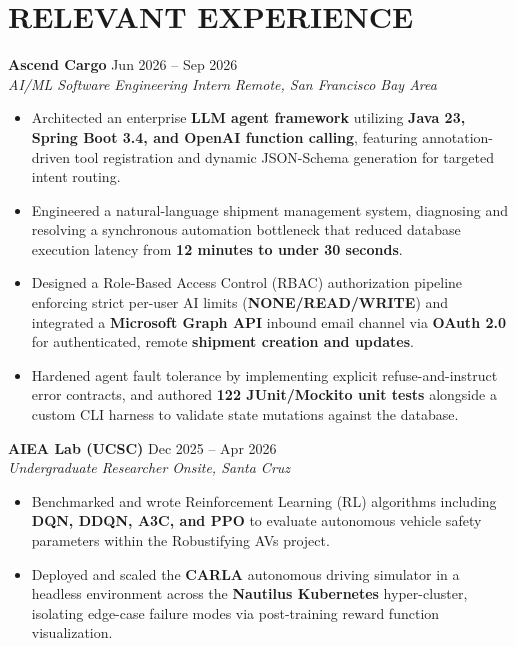 \documentclass[a4paper,10pt]{extarticle}
\begin{document}
\section*{RELEVANT EXPERIENCE}

    \noindent
    \textbf{Ascend Cargo} \hfill Jun 2026 -- Sep 2026 \\
    \textit{AI/ML Software Engineering Intern} \hfill \textit{Remote, San Francisco Bay Area}
    \begin{itemize}[leftmargin=0.2in,]
        \item Architected an enterprise \textbf{LLM agent framework} utilizing \textbf{Java 23, Spring Boot 3.4, and OpenAI function calling}, featuring annotation-driven tool registration and dynamic JSON-Schema generation for targeted intent routing.
        \item Engineered a natural-language shipment management system, diagnosing and resolving a synchronous automation bottleneck that reduced database execution latency from \textbf{12 minutes to under 30 seconds}.
        \item Designed a Role-Based Access Control (RBAC) authorization pipeline enforcing strict per-user AI limits (\textbf{NONE\slash READ\slash WRITE}) and integrated a \textbf{Microsoft Graph API} inbound email channel via \textbf{OAuth 2.0} for authenticated, remote \textbf{shipment creation and updates}.
        \item Hardened agent fault tolerance by implementing explicit refuse-and-instruct error contracts, and authored \textbf{122 JUnit/Mockito unit tests} alongside a custom CLI harness to validate state mutations against the database.
    \end{itemize}
    \vspace{5pt}

    \noindent
    \textbf{AIEA Lab (UCSC)} \hfill Dec 2025 -- Apr 2026 \\
    \textit{Undergraduate Researcher} \hfill \textit{Onsite, Santa Cruz}
    \begin{itemize}[leftmargin=0.2in,]
        \item Benchmarked and wrote Reinforcement Learning (RL) algorithms including \textbf{DQN, DDQN, A3C, and PPO} to evaluate autonomous vehicle safety parameters within the Robustifying AVs project.
        \item Deployed and scaled the \textbf{CARLA} autonomous driving simulator in a headless environment across the \textbf{Nautilus Kubernetes} hyper-cluster, isolating edge-case failure modes via post-training reward function visualization.
    \end{itemize}
    \vspace{5pt}
\end{document}

